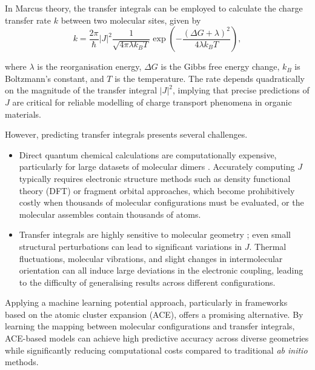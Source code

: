 In Marcus theory, the transfer integrals can be employed to calculate the charge transfer rate $k$ between two molecular sites, given by
\begin{equation} \label{equ:4.1}
    k = \frac{2\pi}{\hbar} |J|^2 \frac{1}{\sqrt{4\pi\lambda k_B T}} \exp\left( -\frac{(\Delta G + \lambda)^2}{4\lambda k_B T} \right),
\end{equation}

where $\lambda$ is the reorganisation energy, $\Delta G$ is the Gibbs free energy change, $k_B$ is Boltzmann’s constant, and $T$ is the temperature.
The rate depends quadratically on the magnitude of the transfer integral $|J|^2$, implying that precise predictions of $J$ are critical for reliable modelling of charge transport phenomena in organic materials.

However, predicting transfer integrals presents several challenges.
\begin{itemize}
    \item Direct quantum chemical calculations are computationally expensive, particularly for large datasets of molecular dimers \cite{Troisi2011}.
    Accurately computing $J$ typically requires electronic structure methods such as density functional theory (DFT) or fragment orbital approaches, which become prohibitively costly when thousands of molecular configurations must be evaluated, or the molecular assembles contain thousands of atoms.
    \item Transfer integrals are highly sensitive to molecular geometry \cite{Troisi2006}; even small structural perturbations can lead to significant variations in $J$.
    Thermal fluctuations, molecular vibrations, and slight changes in intermolecular orientation can all induce large deviations in the electronic coupling, leading to the difficulty of generalising results across different configurations.
\end{itemize}

Applying a machine learning potential approach, particularly in frameworks based on the atomic cluster expansion (ACE), offers a promising alternative.
By learning the mapping between molecular configurations and transfer integrals, ACE-based models can achieve high predictive accuracy across diverse geometries while significantly reducing computational costs compared to traditional \textit{ab initio} methods.

